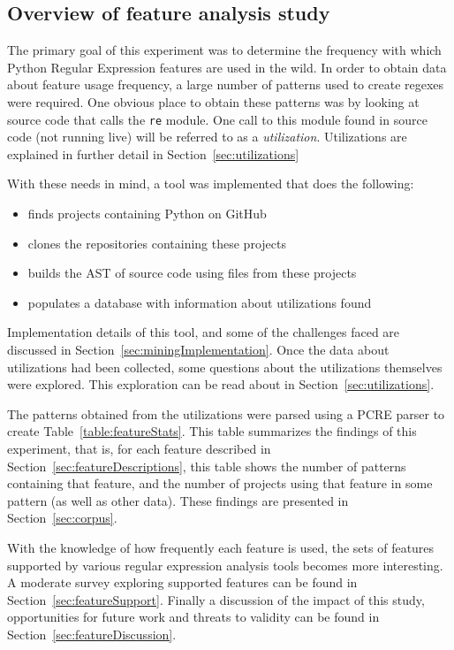 \subsection{Overview of feature analysis study}

The primary goal of this experiment was to determine the frequency with which Python Regular Expression features are used in the wild.  In order to obtain data about feature usage frequency, a large number of patterns used to create regexes were required.  One obvious place to obtain these patterns was by looking at source code that calls the {\tt re} module.  One call to this module found in source code (not running live) will be referred to as a \emph{utilization}.  Utilizations are explained in further detail in Section~\ref{sec:utilizations}

With these needs in mind, a tool was implemented that does the following:
\begin{itemize} \itemsep -1pt
\item finds projects containing Python on GitHub
\item clones the repositories containing these projects
\item builds the AST of source code using files from these projects
\item populates a database with information about utilizations found
\end{itemize}

Implementation details of this tool, and some of the challenges faced are discussed in Section~\ref{sec:miningImplementation}.  Once the data about utilizations had been collected, some questions about the utilizations themselves were explored.  This exploration can be read about in Section~\ref{sec:utilizations}.

The patterns obtained from the utilizations were parsed using a PCRE parser to create Table~\ref{table:featureStats}.  This table summarizes the findings of this experiment, that is, for each feature described in Section~\ref{sec:featureDescriptions}, this table shows the number of patterns containing that feature, and the number of projects using that feature in some pattern (as well as other data).  These findings are presented in Section~\ref{sec:corpus}.

With the knowledge of how frequently each feature is used, the sets of features supported by various regular expression analysis tools becomes more interesting.  A moderate survey exploring supported features can be found in Section~\ref{sec:featureSupport}.  Finally a discussion of the impact of this study, opportunities for future work and threats to validity can be found in Section~\ref{sec:featureDiscussion}.
